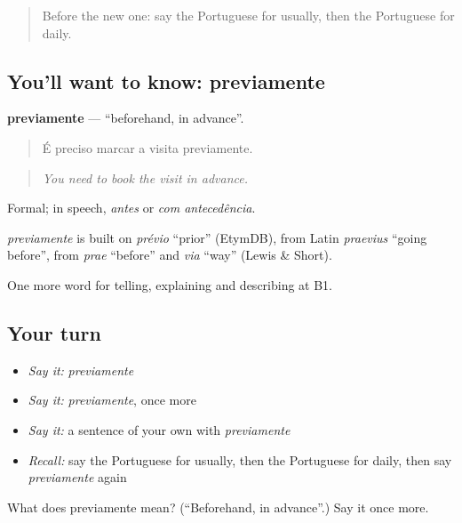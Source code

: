 \label{lesson:PT-C277-previamente}



\begin{quote}
Before the new one: say the Portuguese for usually, then the Portuguese for daily.
\end{quote}

\subsection*{You'll want to know: previamente}
\textbf{previamente} — \textquotedblleft{}beforehand, in advance\textquotedblright{}.

\begin{quote}
É preciso marcar a visita previamente.
\end{quote}

\begin{quote}
\emph{You need to book the visit in advance.}
\end{quote}

Formal; in speech, \emph{antes} or \emph{com antecedência}.

\begin{cousinweb}
\emph{previamente} is built on \emph{prévio} \textquotedblleft{}prior\textquotedblright{} (EtymDB), from Latin \emph{praevius} \textquotedblleft{}going before\textquotedblright{}, from \emph{prae} \textquotedblleft{}before\textquotedblright{} and \emph{via} \textquotedblleft{}way\textquotedblright{} (Lewis \& Short).
\end{cousinweb}

\begin{grammarlens}[title={What you've built}]
One more word for telling, explaining and describing at B1.
\end{grammarlens}

\subsection*{Your turn}
\begin{itemize}
\raggedright
  \item \emph{Say it:} \emph{previamente}
  \item \emph{Say it:} \emph{previamente}, once more
  \item \emph{Say it:} a sentence of your own with \emph{previamente}
  \item \emph{Recall:} say the Portuguese for usually, then the Portuguese for daily, then say \emph{previamente} again
\end{itemize}

\begin{tcolorbox}[breakable,colback=teal!4,colframe=teal!35!black,title={Before you move on}]
What does previamente mean? (\textquotedblleft{}Beforehand, in advance\textquotedblright{}.) Say it once more.
\end{tcolorbox}

